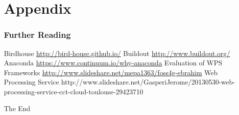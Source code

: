 \documentclass{beamer}
\begin{document}

  \appendix

  \section{Appendix}
  
   \begin{frame}[allowframebreaks]
    \frametitle<presentation>{Further Reading}    
    \begin{thebibliography}{10}    
      \beamertemplatearticlebibitems
      Birdhouse
      \newblock \url{http://bird-house.github.io/}
      Buildout
      \newblock \url{http://www.buildout.org/}
      Anaconda
      \newblock \url{https://www.continuum.io/why-anaconda}
      Evaluation of WPS Frameworks
      \newblock \url{http://www.slideshare.net/mepa1363/foss4g-ebrahim}
      Web Processing Service
      \newblock http://www.slideshare.net/GasperiJerome/20130530-web-processing-service-cct-cloud-toulouse-29423710
   
    \end{thebibliography}
    
  \end{frame}
  

  \begin{frame}
    \Huge{\centerline{The End}}
  \end{frame}

\end{document}
